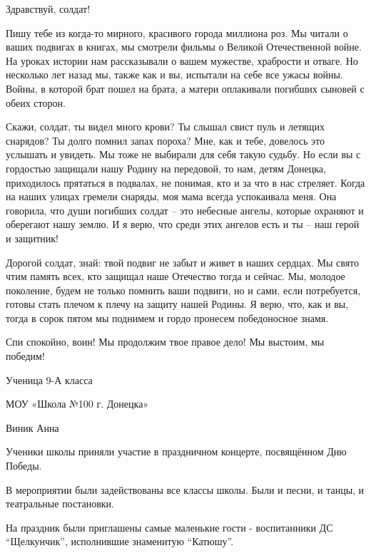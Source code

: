 \begin{zzquote}
Здравствуй, солдат!

Пишу тебе из когда-то мирного, красивого города миллиона роз. Мы читали о ваших
подвигах в книгах, мы смотрели фильмы о Великой Отечественной войне. На уроках
истории нам рассказывали о вашем мужестве, храбрости и отваге. Но несколько лет
назад мы, также как и вы, испытали на себе все ужасы войны. Войны, в которой
брат пошел на брата, а матери оплакивали погибших сыновей с обеих сторон.

Скажи, солдат, ты видел много крови? Ты слышал свист пуль и летящих снарядов?
Ты долго помнил запах пороха? Мне, как и тебе, довелось это услышать и увидеть.
Мы тоже не выбирали для себя такую судьбу. Но если вы с гордостью защищали нашу
Родину на передовой, то нам, детям Донецка, приходилось прятаться в подвалах,
не понимая, кто и за что в нас стреляет. Когда на наших улицах гремели снаряды,
моя мама всегда успокаивала меня. Она говорила, что души погибших солдат – это
небесные ангелы, которые охраняют и оберегают нашу землю. И я верю, что среди
этих ангелов есть и ты – наш герой и защитник!

Дорогой солдат, знай: твой подвиг не забыт и живет в наших сердцах. Мы свято
чтим память всех, кто защищал наше Отечество тогда и сейчас. Мы, молодое
поколение, будем не только помнить ваши подвиги, но и сами, если потребуется,
готовы стать плечом к плечу на защиту нашей Родины. Я верю, что, как и вы,
тогда в сорок пятом мы поднимем и гордо пронесем победоносное знамя.

Спи спокойно, воин! Мы продолжим твое правое дело! Мы выстоим, мы победим!

Ученица 9-А класса

МОУ «Школа №100 г. Донецка»

Виник Анна
\end{zzquote}



Ученики школы приняли участие в праздничном концерте, посвящённом Дню Победы.

В мероприятии были задействованы все классы школы. Были и песни, и танцы, и
театральные постановки.

На праздник были приглашены самые маленькие гости - воспитанники ДС
\enquote{Щелкунчик}, исполнившие знаменитую \enquote{Катюшу}.

